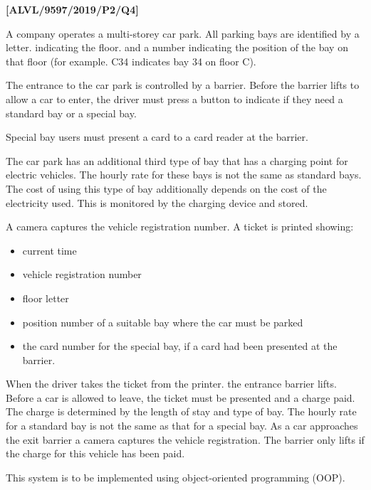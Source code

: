 \item \textbf{{[}ALVL/9597/2019/P2/Q4{]} }

A company operates a multi-storey car park. All parking bays are identified
by a letter. indicating the floor. and a number indicating the position
of the bay on that floor (for example. C34 indicates bay 34 on floor
C). 

The entrance to the car park is controlled by a barrier. Before the
barrier lifts to allow a car to enter, the driver must press a button
to indicate if they need a standard bay or a special bay. 

Special bay users must present a card to a card reader at the barrier. 

The car park has an additional third type of bay that has a charging
point for electric vehicles. The hourly rate for these bays is not
the same as standard bays. The cost of using this type of bay additionally
depends on the cost of the electricity used. This is monitored by
the charging device and stored.

A camera captures the vehicle registration number. A ticket is printed
showing:
\begin{itemize}
\item current time
\item vehicle registration number 
\item floor letter 
\item position number of a suitable bay where the car must be parked 
\item the card number for the special bay, if a card had been presented
at the barrier. 
\end{itemize}
When the driver takes the ticket from the printer. the entrance barrier
lifts. Before a car is allowed to leave, the ticket must be presented
and a charge paid. The charge is determined by the length of stay
and type of bay. The hourly rate for a standard bay is not the same
as that for a special bay. As a car approaches the exit barrier a
camera captures the vehicle registration. The barrier only lifts if
the charge for this vehicle has been paid. 

This system is to be implemented using object-oriented programming
(OOP). 

